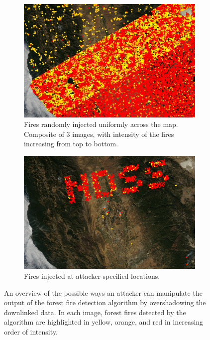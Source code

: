 \begin{figure}
\begin{subfigure}{0.49\textwidth}
        \includegraphics[width=\textwidth]{diagrams/injection/random_combined_diagonal.jpg}
        \caption{Fires randomly injected uniformly across the map. Composite of 3 images, with intensity of the fires increasing from top to bottom.}
        \label{fig:injection-random}
    \end{subfigure}
    \begin{subfigure}{0.49\textwidth}
        \centering
        \includegraphics[width=\textwidth]{diagrams/injection/pixels_800_140.jpg}
        \caption{Fires injected at attacker-specified locations.\newline}
        \label{fig:injection-logo}
    \end{subfigure}
    \caption{An overview of the possible ways an attacker can manipulate the output of the forest fire detection algorithm by overshadowing the downlinked data. In each image, forest fires detected by the algorithm are highlighted in yellow, orange, and red in increasing order of intensity.}
    \label{fig:injection}
\end{figure}

